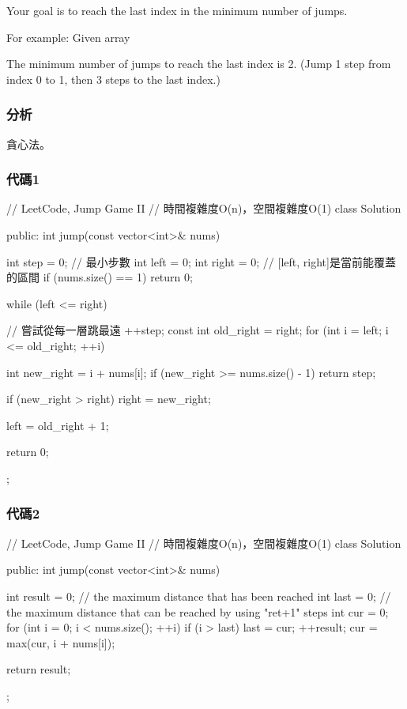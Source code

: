 Your goal is to reach the last index in the minimum number of jumps.

For example:
Given array 

The minimum number of jumps to reach the last index is 2. (Jump 1 step from index 0 to 1, then 3 steps to the last index.)


\subsubsection{分析}
貪心法。


\subsubsection{代碼1}
\begin{Code}
// LeetCode, Jump Game II
// 時間複雜度O(n)，空間複雜度O(1)
class Solution {
public:
    int jump(const vector<int>& nums) {
        int step = 0; // 最小步數
        int left = 0;
        int right = 0;  // [left, right]是當前能覆蓋的區間
        if (nums.size() == 1) return 0;

        while (left <= right) { // 嘗試從每一層跳最遠
            ++step;
            const int old_right = right;
            for (int i = left; i <= old_right; ++i) {
                int new_right = i + nums[i];
                if (new_right >= nums.size() - 1) return step;

                if (new_right > right) right = new_right;
            }
            left = old_right + 1;
        }
        return 0;
    }
};
\end{Code}


\subsubsection{代碼2}
\begin{Code}
// LeetCode, Jump Game II
// 時間複雜度O(n)，空間複雜度O(1)
class Solution {
public:
    int jump(const vector<int>& nums) {
        int result = 0;
        // the maximum distance that has been reached
        int last = 0;
        // the maximum distance that can be reached by using "ret+1" steps
        int cur = 0;
        for (int i = 0; i < nums.size(); ++i) {
            if (i > last) {
                last = cur;
                ++result;
            }
            cur = max(cur, i + nums[i]);
        }

        return result;
    }
};
\end{Code}


